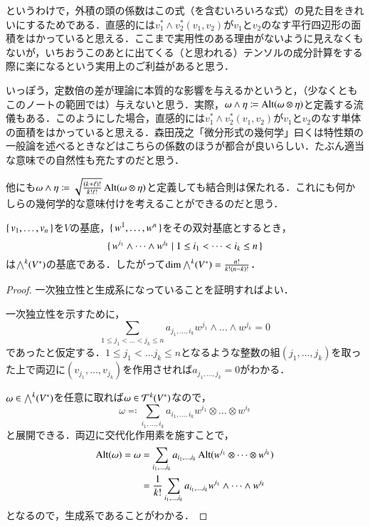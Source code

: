 \begin{dig}
というわけで，外積の頭の係数はこの式（を含むいろいろな式）の見た目をきれいにするためである．直感的には$v_1^* \wedge v_2^* (v_1, v_2)$が$v_1$と$v_2$のなす平行四辺形の面積をはかっていると思える．ここまで実用性のある理由がないように見えなくもないが，いちおうこのあとに出てくる（と思われる）テンソルの成分計算をする際に楽になるという実用上のご利益があると思う．
\end{dig}

\begin{que}[*]
いっぽう，定数倍の差が理論に本質的な影響を与えるかというと，（少なくともこのノートの範囲では）与えないと思う．実際，$\omega \wedge \eta \coloneqq \operatorname{Alt} (\omega \otimes \eta)$と定義する流儀もある．このようにした場合，直感的には$v_1^* \wedge v_2^* (v_1, v_2)$が$v_1$と$v_2$のなす単体の面積をはかっていると思える．森田茂之「微分形式の幾何学」曰くは特性類の一般論を述べるときなどはこちらの係数のほうが都合が良いらしい．たぶん適当な意味での自然性も充たすのだと思う．

他にも$\omega \wedge \eta \coloneqq \sqrt{\frac{(k+\ell)!}{k!\ell!}} \operatorname{Alt} (\omega \otimes \eta)$と定義しても結合則は保たれる．これにも何かしらの幾何学的な意味付けを考えることができるのだと思う．
\end{que}

\begin{thm}
$\set{v_1, \dots, v_n}$を$V$の基底，$\set{w^1, \dots, w^n}$をその双対基底とするとき，
\begin{equation}
\set{w^{i_1} \wedge \dots \wedge w^{i_k} | 1 \leq i_1 < \dots < i_k \leq n}
\end{equation}は$\bigwedge^k(V^*)$の基底である．したがって$\dim \bigwedge^k(V^*) = \frac{n!}{k!(n-k)!}$．
\end{thm}

\begin{proof}
一次独立性と生成系になっていることを証明すればよい．

一次独立性を示すために，
\begin{equation}
\sum_{1 \leq j_1 < \dots < j_k \leq n} a_{j_1,\dots,i_k} w^{j_1} \wedge \dots \wedge w^{j_k} = 0
\end{equation}であったと仮定する．$1 \leq j_1 < \dots j_k \leq n$となるような整数の組$(j_1, \dots, j_k)$を取った上で両辺に$(v_{j_1}, \dots, v_{j_k})$を作用させれば$a_{j_1,\dots,j_k}=0$がわかる．

$\omega \in \bigwedge^k(V^*)$を任意に取れば$\omega \in \mathcal{T}^k(V^*)$なので，
\begin{equation}
\omega \eqqcolon \sum_{i_1, \dots, i_k} a_{i_1,\dots,i_k} w^{i_1} \otimes \dots \otimes w^{i_k}
\end{equation}と展開できる．両辺に交代化作用素を施すことで，
\begin{align}
\operatorname{Alt}(\omega) = \omega &= \sum_{i_1, \dots, i_k} a_{i_1,\dots,i_k} \operatorname{Alt}(w^{i_1} \otimes \dots \otimes w^{i_k}) \\
&= \frac{1}{k!} \sum_{i_1, \dots, i_k} a_{i_1,\dots,i_k} w^{i_1} \wedge \dots \wedge w^{i_k}
\end{align}となるので，生成系であることがわかる．
\end{proof}

